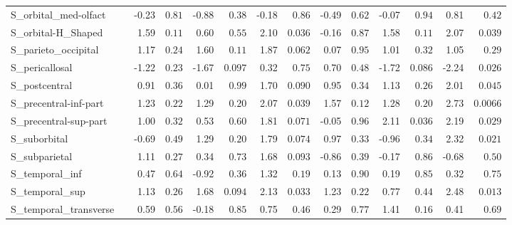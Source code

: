 {\begin{longtable}{llrrrrrrrrrrrr}
S\_orbital\_med-olfact &  & -0.23 & $0.81$ & -0.88 & $0.38$ & -0.18 & $0.86$ & -0.49 & $0.62$ & -0.07 & $0.94$ & 0.81 & $0.42$ \\
S\_orbital-H\_Shaped &  & 1.59 & $0.11$ & 0.60 & $0.55$ & 2.10 & $0.036$ & -0.16 & $0.87$ & 1.58 & $0.11$ & 2.07 & $0.039$ \\
S\_parieto\_occipital &  & 1.17 & $0.24$ & 1.60 & $0.11$ & 1.87 & $0.062$ & 0.07 & $0.95$ & 1.01 & $0.32$ & 1.05 & $0.29$ \\
S\_pericallosal &  & -1.22 & $0.23$ & -1.67 & $0.097$ & 0.32 & $0.75$ & 0.70 & $0.48$ & -1.72 & $0.086$ & -2.24 & $0.026$ \\
S\_postcentral &  & 0.91 & $0.36$ & 0.01 & $0.99$ & 1.70 & $0.090$ & 0.95 & $0.34$ & 1.13 & $0.26$ & 2.01 & $0.045$ \\
S\_precentral-inf-part &  & 1.23 & $0.22$ & 1.29 & $0.20$ & 2.07 & $0.039$ & 1.57 & $0.12$ & 1.28 & $0.20$ & 2.73 & $0.0066$ \\
S\_precentral-sup-part &  & 1.00 & $0.32$ & 0.53 & $0.60$ & 1.81 & $0.071$ & -0.05 & $0.96$ & 2.11 & $0.036$ & 2.19 & $0.029$ \\
S\_suborbital &  & -0.69 & $0.49$ & 1.29 & $0.20$ & 1.79 & $0.074$ & 0.97 & $0.33$ & -0.96 & $0.34$ & 2.32 & $0.021$ \\
S\_subparietal &  & 1.11 & $0.27$ & 0.34 & $0.73$ & 1.68 & $0.093$ & -0.86 & $0.39$ & -0.17 & $0.86$ & -0.68 & $0.50$ \\
S\_temporal\_inf &  & 0.47 & $0.64$ & -0.92 & $0.36$ & 1.32 & $0.19$ & 0.13 & $0.90$ & 0.19 & $0.85$ & 0.32 & $0.75$ \\
S\_temporal\_sup &  & 1.13 & $0.26$ & 1.68 & $0.094$ & 2.13 & $0.033$ & 1.23 & $0.22$ & 0.77 & $0.44$ & 2.48 & $0.013$ \\
S\_temporal\_transverse &  & 0.59 & $0.56$ & -0.18 & $0.85$ & 0.75 & $0.46$ & 0.29 & $0.77$ & 1.41 & $0.16$ & 0.41 & $0.69$ \\
\end{longtable}}
